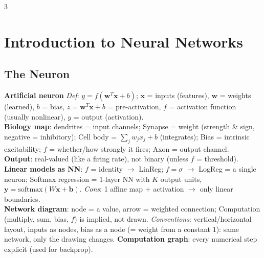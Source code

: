 \documentclass[10pt]{article}
\newcommand{\vx}{\mathbf{x}}
\newcommand{\vw}{\mathbf{w}}
\newcommand{\sub}[1]{\textit{#1}:}  %
\newcommand{\vb}{\mathbf{b}}
\newcommand{\vy}{\mathbf{y}}
\begin{document}
\begin{multicols*}{3}
\section{Introduction to Neural Networks}
\subsection{The Neuron}
\textbf{Artificial neuron} \sub{Def} $y=f(\vw^T\vx+b)$; $\vx$ = inputs (features), $\vw$ = weights (learned), $b$ = bias, $z=\vw^T\vx+b$ = pre-activation, $f$ = activation function (usually nonlinear), $y$ = output (activation).\\
\textbf{Biology map}: dendrites = input channels; Synapse = weight (strength \& sign, negative = inhibitory); Cell body = $\sum_jw_jx_j+b$ (integrates); Bias = intrinsic excitability; $f$ = whether/how strongly it fires; Axon = output channel.\\
\textbf{Output}: real-valued (like a firing rate), not binary (unless $f$ = threshold).\\
\textbf{Linear models as NN}: $f$ = identity $\to$ LinReg; $f=\sigma$ $\to$ LogReg = a single neuron; Softmax regression = 1-layer NN with $K$ output units, $\vy=\text{softmax}(W\vx+\vb)$. \sub{Cons} 1 affine map + activation $\to$ only linear boundaries.\\
\textbf{Network diagram}: node = a value, arrow = weighted connection; Computation (multiply, sum, bias, $f$) is implied, not drawn. \sub{Conventions} vertical/horizontal layout, inputs as nodes, bias as a node (= weight from a constant 1): same network, only the drawing changes. \textbf{Computation graph}: every numerical step explicit (used for backprop).


\end{multicols*}
\end{document}
